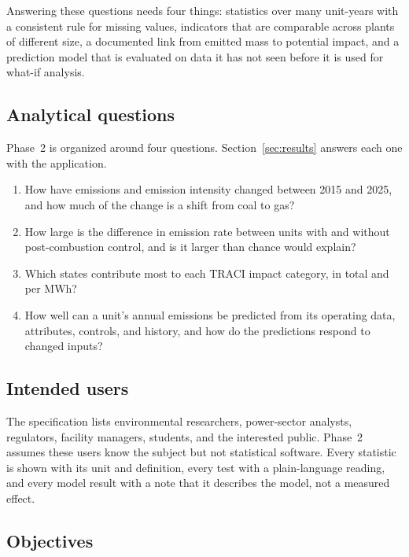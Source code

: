 \documentclass[11pt,a4paper]{article}
\begin{document}
Answering these questions needs four things: statistics over many unit-years with a consistent
rule for missing values, indicators that are comparable across plants of different size, a
documented link from emitted mass to potential impact, and a prediction model that is evaluated
on data it has not seen before it is used for what-if analysis.

\subsection{Analytical questions}

Phase~2 is organized around four questions. Section~\ref{sec:results} answers each one with the
application.
\begin{enumerate}[label=Q\arabic*.]
  \item How have emissions and emission intensity changed between 2015 and 2025, and how much of
        the change is a shift from coal to gas?
  \item How large is the difference in \NOx{} emission rate between units with and without
        post-combustion \NOx{} control, and is it larger than chance would explain?
  \item Which states contribute most to each TRACI impact category, in total and per MWh?
  \item How well can a unit's annual \NOx{} emissions be predicted from its operating data,
        attributes, controls, and history, and how do the predictions respond to changed inputs?
\end{enumerate}

\subsection{Intended users}

The specification lists environmental researchers, power-sector analysts, regulators, facility
managers, students, and the interested public. Phase~2 assumes these users know the subject but
not statistical software. Every statistic is shown with its unit and definition, every test
with a plain-language reading, and every model result with a note that it describes the model,
not a measured effect.

\subsection{Objectives}
\end{document}
